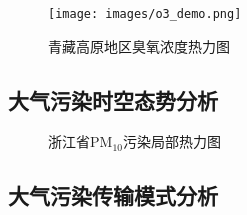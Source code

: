 \documentclass[UTF8]{ctexrep}
\begin{document}
    \begin{figure}[h!]
        \centering
        \texttt{[image: images/o3\_demo.png]}
        \caption{青藏高原地区臭氧浓度热力图}
        \label{fig:o3_tibet}
    \end{figure}

    \subsection{大气污染时空态势分析}
    
    \begin{figure}[h!]
        \centering
        \caption{浙江省$\mathrm{PM}_{10}$污染局部热力图}
        \label{fig:time_space}
    \end{figure}

    \subsection{大气污染传输模式分析}
    
\end{document}
